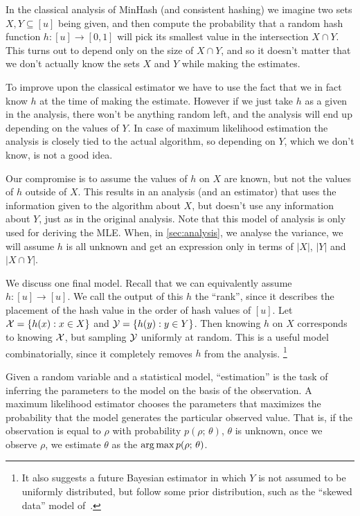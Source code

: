 In the classical analysis of MinHash (and consistent hashing)
we imagine two sets $X,Y\subseteq[u]$ being given,
and then compute the probability that a random hash function $h:[u]\to[0,1]$ will pick its smallest value in the intersection $X\cap Y$.
This turns out to depend only on the size of $X\cap Y$, and so it doesn't matter that we don't actually know the sets $X$ and $Y$ while making the estimates.

To improve upon the classical estimator we have to use the fact that we in fact know $h$ at the time of making the estimate.
However if we just take $h$ as a given in the analysis, there won't be anything random left, and the analysis will end up depending on the values of $Y$.
In case of maximum likelihood estimation the analysis is closely tied to the actual algorithm, so depending on $Y$, which we don't know, is not a good idea.

Our compromise is to assume the values of $h$ on $X$ are known, but not the values of $h$ outside of $X$.
This results in an analysis (and an estimator) that uses the information given to the algorithm about $X$, but doesn't use any information about $Y$, just as in the original analysis.
Note that this model of analysis is only used for deriving the MLE.
When, in \cref{sec:analysis}, we analyse the variance, we will assume $h$ is all unknown and get an expression only in terms of $|X|$, $|Y|$ and $|X\cap Y|$.

We discuss one final model.
Recall that we can equivalently assume $h:[u]\to[u]$.
We call the output of this $h$ the ``rank'', since it describes the placement of the hash value in the order of hash values of $[u]$.
Let $\mathcal{X}=\{h(x) : x\in X\}$ and $\mathcal{Y}=\{h(y):y\in Y\}$.
Then knowing $h$ on $X$ corresponds to knowing $\mathcal{X}$, but sampling $\mathcal{Y}$ uniformly at random.
This is a useful model combinatorially, since it completely removes $h$ from the analysis.
\footnote{
   It also suggests a future Bayesian estimator in which $Y$ is not assumed to be uniformly distributed, but follow some prior distribution, such as the ``skewed data'' model of~\cite{mccauley2018set}.
}

\smallskip

Given a random variable and a statistical model, ``estimation'' is the task of inferring the parameters to the model on the basis of the observation.
A maximum likelihood estimator chooses the parameters that maximizes the probability that the model generates the particular observed value.
That is, if the observation is equal to $\rho$ with probability $p(\rho;\,\theta)$, $\theta$ is unknown, once we observe $\rho$, we estimate $\theta$ as the $\operatorname*{arg\,max} p(\rho;\,\theta)$.

